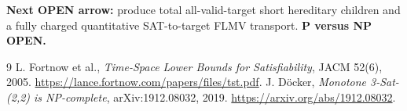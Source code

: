 \documentclass[10pt]{article}
\begin{document}
\noindent\textbf{Next OPEN arrow:} produce total all-valid-target short hereditary children and a fully charged quantitative SAT-to-target FLMV transport. \textbf{P versus NP OPEN.}
\begin{thebibliography}{9}
 L. Fortnow et al., \emph{Time-Space Lower Bounds for Satisfiability}, JACM 52(6), 2005. \url{https://lance.fortnow.com/papers/files/tst.pdf}.
 J. D\"ocker, \emph{Monotone 3-Sat-(2,2) is NP-complete}, arXiv:1912.08032, 2019. \url{https://arxiv.org/abs/1912.08032}.
\end{thebibliography}
\end{document}
